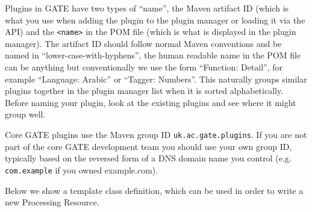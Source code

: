 
Plugins in GATE have two types of ``name'', the Maven artifact ID (which is
what you use when adding the plugin to the plugin manager or loading it via the
API) and the \verb!<name>! in the POM file (which is what is displayed in the
plugin manager).  The artifact ID should follow normal Maven conventions and be
named in ``lower-case-with-hyphens'', the human readable name in the POM file
can be anything but conventionally we use the form ``Function: Detail'', for
example ``Language: Arabic'' or ``Tagger: Numbers''.  This naturally groups
similar plugins together in the plugin manager list when it is sorted
alphabetically.  Before naming your plugin, look at the existing plugins and
see where it might group well.

Core GATE plugins use the Maven group ID \verb!uk.ac.gate.plugins!.  If you are
not part of the core GATE development team you should use your own group ID,
typically based on the reversed form of a DNS domain name you control (e.g.
\verb!com.example! if you owned example.com).



Below we show a template class definition, which can be used in order to write a
new Processing Resource.

